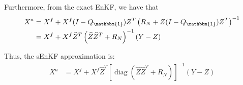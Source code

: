\documentclass[11p]{elsarticle}
\numberwithin{equation}{section}
\begin{document}
Furthermore, from the exact EnKF, we have that
\begin{equation}\label{X-Z}
\begin{aligned}
X^a&=
X^f+X^f(I-Q_{\mathbbm{1}})Z^T\left(
R_N+Z(I-Q_{\mathbbm{1}})Z^T\right)^{-1}\\
&=X^f + X^f\widehat{Z}^T\left(\widehat{Z}\widehat{Z}^T+R_N\right)^{-1}(Y-Z)
\end{aligned}
\end{equation}



Thus, the sEnKF approximation is:
\begin{equation}
\begin{aligned}
X^a &= X^f + X^f\widehat{Z}^T\left[\operatorname{diag}
\left(\widehat{Z}\widehat{Z}^T+R_N\right)
\right]^{-1}(Y - Z)
\end{aligned}
\end{equation}







 

\end{document}
